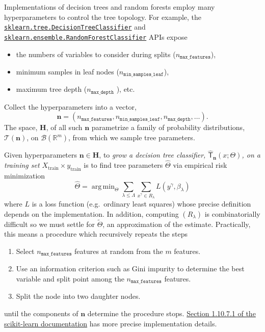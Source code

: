 \documentclass[11pt]{article}
\DeclareMathOperator*{\argmin}{arg\,min}
\theoremstyle{definition}
\numberwithin{equation}{section}
\begin{document}
Implementations of decision trees and random forests employ many hyperparameters to control the tree topology. For example, the \href{https://scikit-learn.org/stable/modules/generated/sklearn.tree.DecisionTreeClassifier.html#sklearn.tree.DecisionTreeClassifier}{\texttt{sklearn.tree.DecisionTreeClassifier}} and \href{https://scikit-learn.org/stable/modules/generated/sklearn.ensemble.RandomForestClassifier.html\#sklearn.ensemble.RandomForestClassifier}{\texttt{sklearn.ensemble.RandomForestClassifier}} APIs expose
\begin{itemize}
\item the numbers of variables to consider during splits ($n_\mathtt{max\_features}$),
\item minimum samples in leaf nodes ($n_\mathtt{min\_samples\_leaf}$),
\item maximum tree depth ($n_\mathtt{max\_depth}$ ), etc. 
\end{itemize}
Collect the hyperparameters into a vector,
\begin{equation}
\mathbf{n} = (n_\mathtt{max\_features}, n_\mathtt{min\_samples\_leaf}, n_\mathtt{max\_depth}, \ldots).
\end{equation}
The space, $\mathbf{H}$, of all such $\mathbf{n}$ parametrize a family of probability distributions, 
$\mathcal{T} (\mathbf{n})$, on $\mathcal{B} (\mathbb{R}^m)$, from which we sample tree parameters.



Given hyperparameters $\mathbf{n} \in \mathbf{H}$, to \emph{grow a decision tree classifier, $\hat{\mathsf{T}}_\mathbf{n} (x ; \Theta)$,
 on a training set $X_\text{train} \times y_\text{train}$} 
is to find tree parameters $\hat{\Theta}$
via empirical risk minimization
\begin{equation}
\hat{\Theta} = \argmin_\Theta \sum_{\lambda \leq \Lambda} \sum_{x^\gamma \in R_\lambda} L(y^\gamma, \beta_\lambda)
\end{equation}
where $L$ is a loss function (e.g.~ordinary least squares) whose precise definition depends on the implementation. In addition, computing $(R_\lambda)$ is combinatorially difficult so we must settle for $\tilde{\Theta}$, an approximation of the estimate. Practically, this means a procedure which recursively repeats the steps
\begin{enumerate}
\item Select $n_\mathtt{max\_features}$ features at random from the $m$ features.
\item Use an information criterion such as Gini impurity to determine the best variable and split point among the $n_\mathtt{max\_features}$ features.
\item Split the node into two daughter nodes.
\end{enumerate}
until the components of $\mathbf{n}$ determine the procedure stops. \href{https://scikit-learn.org/stable/modules/tree.html#mathematical-formulation}{Section 1.10.7.1 of the scikit-learn documentation} has more precise implementation details.
\end{document}

